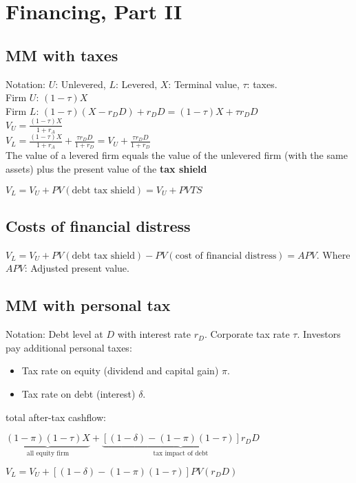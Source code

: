 \section{Financing, Part II}

\subsection*{MM with taxes}

Notation: $U$: Unlevered, $L$: Levered, 
 $X$: Terminal value, $\tau$: taxes. \\
Firm $U$: $(1-\tau)X$ \\
Firm $L$: $(1-\tau)(X-r_D D) + r_D D = (1-\tau)X + \tau r_D D $ \\
$V_U =\frac{(1-\tau)X}{1+r_A} $ \\
$V_L =\frac{(1-\tau)X}{1+r_A} + \frac{\tau r_D D}{1+r_D} = V_U + \frac{\tau r_D D}{1+r_D}  $ \\


The value of a levered firm equals the value of the unlevered
firm (with the same assets) plus the present value of the {\bf tax shield}

$V_L = V_U + PV(\text{debt tax shield}) = V_U + PVTS$

\subsection*{Costs of financial distress }

$V_L = V_U + PV(\text{debt tax shield}) - PV (\text{cost of financial distress}) = APV$. Where $APV$: Adjusted present value.

\subsection*{MM with personal tax}

Notation: Debt level at $D$ with interest rate $r_D$.
Corporate tax rate $\tau$. Investors pay additional personal taxes:
\begin{itemize}
	\item Tax rate on equity (dividend and capital gain) $\pi$.
	\item Tax rate on debt (interest) $\delta$.
\end{itemize}

total after-tax cashflow:

$\underbrace{(1-\pi)(1-\tau)X}_{\text{all equity firm}} + \underbrace{[(1-\delta)-(1-\pi)(1-\tau)]r_DD}_{\text{tax impact of debt}}$

$V_L = V_U + [(1-\delta)-(1-\pi)(1-\tau)]PV(r_DD) $